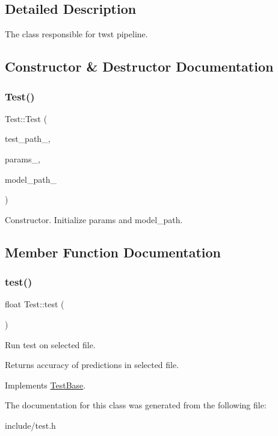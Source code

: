 \subsection{Detailed Description}
The class responsible for twst pipeline. 

\subsection{Constructor \& Destructor Documentation}
\mbox{\label{class_test_a6eeaef1054e710158c2d48a6c3497a23}} 
\subsubsection{\texorpdfstring{Test()}{Test()}}
{\footnotesize\ttfamily Test\+::\+Test (\begin{DoxyParamCaption}\item[{string}]{test\+\_\+path\+\_\+,  }\item[{const \hyperlink{struct_train_parameters}{Train\+Parameters} \&}]{params\+\_\+,  }\item[{string}]{model\+\_\+path\+\_\+ }\end{DoxyParamCaption})\hspace{0.3cm}{\ttfamily [explicit]}}

Constructor. Initialize params and model\+\_\+path. 

\subsection{Member Function Documentation}
\mbox{\label{class_test_ae984138ce2da7b201d3fa97a4b775fb3}} 
\subsubsection{\texorpdfstring{test()}{test()}}
{\footnotesize\ttfamily float Test\+::test (\begin{DoxyParamCaption}{ }\end{DoxyParamCaption})\hspace{0.3cm}{\ttfamily [virtual]}}

Run test on selected file. \begin{DoxyReturn}{Returns}
accuracy of predictions in selected file. 
\end{DoxyReturn}


Implements \hyperlink{class_test_base}{Test\+Base}.



The documentation for this class was generated from the following file\+:\begin{DoxyCompactItemize}
\item 
include/test.\+h\end{DoxyCompactItemize}
